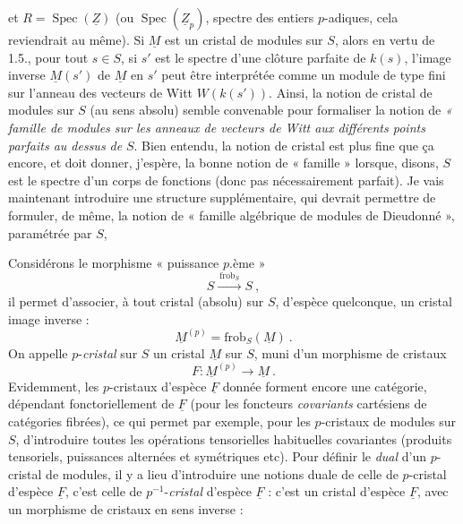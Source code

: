 \documentclass[11pt,a4paper]{article}
\begin{document}
et $R=\operatorname{Spec}(\underline{Z})$ (ou
$\operatorname{Spec}(\underline{Z}_p)$, spectre des entiers $p$-adiques, cela
reviendrait au même). Si $\underline{M}$ est un cristal de modules sur $S$,
 alors en vertu de 1.5., pour tout $s\in S$, si
$s'$ est le spectre d'une clôture parfaite de $k(s)$, l'image inverse
$\underline{M}(s')$ de $\underline{M}$ en $s'$ peut être interprétée comme un
module de type fini sur l'anneau des vecteurs de Witt $W(k(s'))$. Ainsi,
la notion de cristal de modules sur $S$ (au sens absolu) semble convenable pour
formaliser la notion de \emph{« famille  de modules sur les
anneaux de vecteurs de Witt aux différents points parfaits au dessus de}
$S$. Bien entendu, la notion de cristal est
plus fine que ça encore, et doit donner, j'espère, la bonne notion de
« famille » lorsque, disons, $S$ est le spectre d'un corps de fonctions (donc
pas nécessairement parfait). Je vais maintenant introduire une structure
supplémentaire, qui devrait permettre de formuler, de même, la notion de
« famille algébrique de modules de Dieudonné », paramétrée par $S$,

Considérons le morphisme « puissance $p$.ème »
\[
  S\xrightarrow{\ \mathrm{frob}_S\ }S\ ,
\]
il permet d'associer, à tout cristal (absolu) sur $S$, d'espèce quelconque, un
cristal image inverse :
\[
  \underline{M}^{(p)}=\mathrm{frob}_S(\underline{M})\ .
\]
On appelle $p$-\emph{cristal} sur $S$ un cristal $\underline{M}$ sur $S$, muni
d'un morphisme de cristaux
\[
  F\colon \underline{M}^{(p)}\longrightarrow\underline{M}\ .
\]
Evidemment, les $p$-cristaux  d'espèce $\underline{F}$ donnée
forment encore une catégorie, dépendant fonctoriellement de $\underline{F}$
(pour les foncteurs \emph{covariants} cartésiens de catégories fibrées), ce qui
permet par exemple, pour les $p$-cristaux de modules sur $S$, d'introduire
toutes les opérations tensorielles habituelles covariantes (produits
tensoriels, puissances alternées et symétriques etc). Pour 
définir le \emph{dual} d'un $p$-cristal de modules, il y a lieu d'introduire
une notions duale de celle de $p$-cristal d'espèce $\underline{F}$, c'est celle
de $p^{-1}$-\emph{cristal} d'espèce $\underline{F}$ : c'est un cristal
d'espèce $\underline{F}$, avec un morphisme de cristaux en sens inverse :
\end{document}
